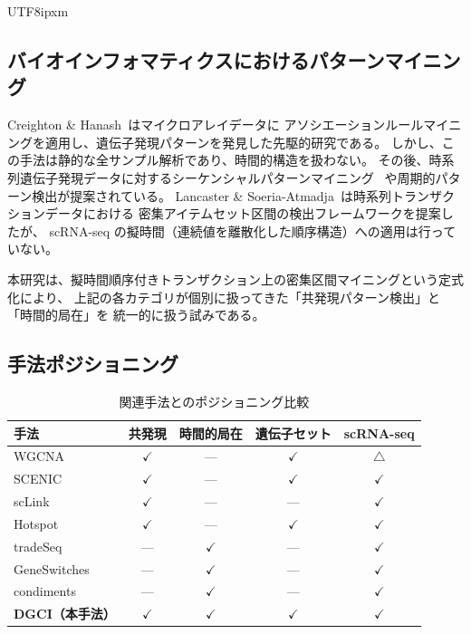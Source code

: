 \documentclass[11pt,a4paper]{article}
\begin{document}
\begin{CJK}{UTF8}{ipxm}
\subsection{バイオインフォマティクスにおけるパターンマイニング}

Creighton \& Hanash~\cite{creighton2003mining}はマイクロアレイデータに
アソシエーションルールマイニングを適用し、遺伝子発現パターンを発見した先駆的研究である。
しかし、この手法は静的な全サンプル解析であり、時間的構造を扱わない。
その後、時系列遺伝子発現データに対するシーケンシャルパターンマイニング~\cite{ji2005mining}
や周期的パターン検出が提案されている。
Lancaster \& Soeria-Atmadja~\cite{lancaster2018dense}は時系列トランザクションデータにおける
密集アイテムセット区間の検出フレームワークを提案したが、
scRNA-seq の擬時間（連続値を離散化した順序構造）への適用は行っていない。

本研究は、擬時間順序付きトランザクション上の密集区間マイニングという定式化により、
上記の各カテゴリが個別に扱ってきた「共発現パターン検出」と「時間的局在」を
統一的に扱う試みである。

\subsection{手法ポジショニング}

\begin{table}[t]
\centering
\caption{関連手法とのポジショニング比較}
\label{tab:positioning}
\begin{tabular}{l|cccc}
\toprule
手法 & 共発現 & 時間的局在 & 遺伝子セット & scRNA-seq \\
\midrule
WGCNA~\cite{langfelder2008wgcna}       & $\checkmark$ & --- & $\checkmark$ & $\triangle$ \\
SCENIC~\cite{aibar2017scenic}           & $\checkmark$ & --- & $\checkmark$ & $\checkmark$ \\
scLink~\cite{li2021sclink}              & $\checkmark$ & --- & --- & $\checkmark$ \\
Hotspot~\cite{detomaso2021hotspot}      & $\checkmark$ & --- & $\checkmark$ & $\checkmark$ \\
tradeSeq~\cite{vandenberge2020tradeseq} & --- & $\checkmark$ & --- & $\checkmark$ \\
GeneSwitches~\cite{cao2020geneswitches} & --- & $\checkmark$ & --- & $\checkmark$ \\
condiments~\cite{rouxdebezieux2024condiments} & --- & $\checkmark$ & --- & $\checkmark$ \\
\textbf{DGCI（本手法）} & $\checkmark$ & $\checkmark$ & $\checkmark$ & $\checkmark$ \\
\bottomrule
\end{tabular}
\end{table}


\end{CJK}
\end{document}
